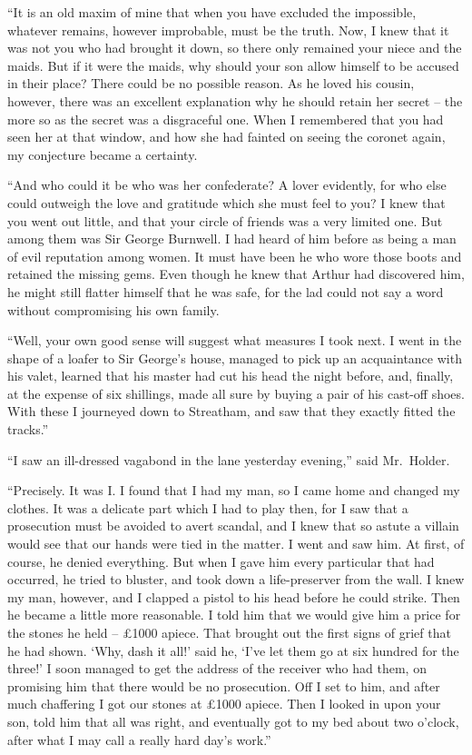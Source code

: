 “It is an old maxim of mine that when you have excluded
the impossible, whatever remains, however improbable, must
be the truth. Now, I knew that it was not you who had
brought it down, so there only remained your niece and the
maids. But if it were the maids, why should your son allow
himself to be accused in their place? There could be no
possible reason. As he loved his cousin, however, there was
an excellent explanation why he should retain her secret -- the
more so as the secret was a disgraceful one. When I remembered
that you had seen her at that window, and how she
had fainted on seeing the coronet again, my conjecture became
a certainty.

“And who could it be who was her confederate? A lover
evidently, for who else could outweigh the love and gratitude
which she must feel to you? I knew that you went out little,
and that your circle of friends was a very limited one. But
among them was Sir George Burnwell. I had heard of him
before as being a man of evil reputation among women. It
must have been he who wore those boots and retained the
missing gems. Even though he knew that Arthur had discovered
him, he might still flatter himself that he was safe,
for the lad could not say a word without compromising his
own family.

“Well, your own good sense will suggest what measures I
took next. I went in the shape of a loafer to Sir George’s
house, managed to pick up an acquaintance with his valet,
learned that his master had cut his head the night before, and,
finally, at the expense of six shillings, made all sure by buying
a pair of his cast-off shoes. With these I journeyed down to
Streatham, and saw that they exactly fitted the tracks.”

“I saw an ill-dressed vagabond in the lane yesterday evening,”
said Mr.~Holder.

“Precisely. It was I. I found that I had my man, so I
came home and changed my clothes. It was a delicate part
which I had to play then, for I saw that a prosecution must
be avoided to avert scandal, and I knew that so astute a villain
would see that our hands were tied in the matter. I went
and saw him. At first, of course, he denied everything. But
when I gave him every particular that had occurred, he tried
to bluster, and took down a life-preserver from the wall. I
knew my man, however, and I clapped a pistol to his head
before he could strike. Then he became a little more reasonable.
I told him that we would give him a price for the
stones he held -- £1000 apiece. That brought out the first
signs of grief that he had shown. ‘Why, dash it all!’ said he,
‘I’ve let them go at six hundred for the three!’ I soon managed
to get the address of the receiver who had them, on
promising him that there would be no prosecution. Off I set
to him, and after much chaffering I got our stones at £1000
apiece. Then I looked in upon your son, told him that all
was right, and eventually got to my bed about two o’clock,
after what I may call a really hard day’s work.”

